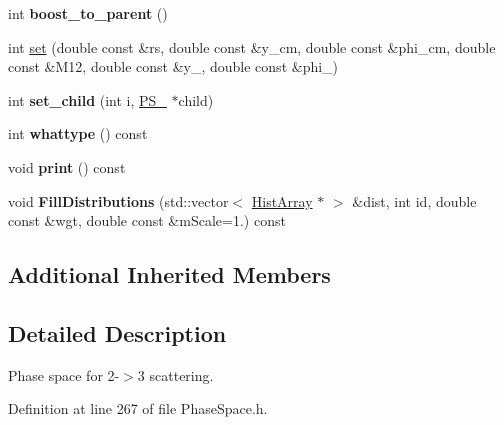 \begin{DoxyCompactItemize}
\item 
\hypertarget{classPS__2__3_ad6c103ccf419ec6f416c54866d305fd0}{int {\bfseries boost\-\_\-to\-\_\-parent} ()}\label{classPS__2__3_ad6c103ccf419ec6f416c54866d305fd0}

\item 
int \hyperlink{classPS__2__3_a278af8edd62fe80330a5dc5f2d385bf5}{set} (double const \&rs, double const \&y\-\_\-cm, double const \&phi\-\_\-cm, double const \&M12, double const \&y\-\_, double const \&phi\-\_)
\item 
\hypertarget{classPS__2__3_a2da075a0d45b58fd9b4b50f6185a7368}{int {\bfseries set\-\_\-child} (int i, \hyperlink{classPS__2}{P\-S\-\_} $\ast$child)}\label{classPS__2__3_a2da075a0d45b58fd9b4b50f6185a7368}

\item 
\hypertarget{classPS__2__3_ab7105d8734ec97b22c0104bd451d619b}{int {\bfseries whattype} () const }\label{classPS__2__3_ab7105d8734ec97b22c0104bd451d619b}

\item 
\hypertarget{classPS__2__3_a98b7559fbc72002c2dd6dadb1db9be0b}{void {\bfseries print} () const }\label{classPS__2__3_a98b7559fbc72002c2dd6dadb1db9be0b}

\item 
\hypertarget{classPS__2__3_a26a7c2e7cc989094314149b770ba5d38}{void {\bfseries Fill\-Distributions} (std\-::vector$<$ \hyperlink{classHistArray}{Hist\-Array} $\ast$ $>$ \&dist, int id, double const \&wgt, double const \&m\-Scale=1.) const }\label{classPS__2__3_a26a7c2e7cc989094314149b770ba5d38}

\end{DoxyCompactItemize}
\subsection*{Additional Inherited Members}


\subsection{Detailed Description}
Phase space for 2-\/$>$3 scattering. 

Definition at line 267 of file Phase\-Space.\-h.



